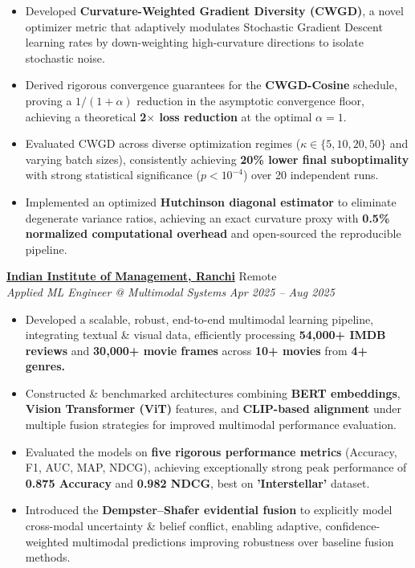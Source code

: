 \documentclass[10.5pt, a4paper]{article}
\newcommand{\resumeItem}[1]{\item[\textbullet] #1}
\newcommand{\expEntry}[4]{%
    \hspace*{-16pt}%
    \textbf{#1} \hfill #2 \\
    \hspace*{-12pt}%
    \textit{#3} \hfill \textit{#4} \\[-4pt]
    \vspace{-6pt}
}
\begin{document}
\begin{itemize}[leftmargin=-1pt,itemsep=1pt,topsep=-2pt,parsep=0pt]
\resumeItem{Developed \textbf{Curvature-Weighted Gradient Diversity (CWGD)}, a novel optimizer metric that adaptively modulates Stochastic Gradient Descent learning rates by down-weighting high-curvature directions to isolate stochastic noise.}

    \resumeItem{Derived rigorous convergence guarantees for the \textbf{CWGD-Cosine} schedule, proving a \textbf{$1/(1+\alpha)$} reduction in the asymptotic convergence floor, achieving a theoretical \textbf{2$\times$ loss reduction} at the optimal $\alpha=1$.}

    \resumeItem{Evaluated CWGD across diverse optimization regimes ($\kappa\in\{5,10,20,50\}$ and varying batch sizes), consistently achieving \textbf{20\% lower final suboptimality} with strong statistical significance (\textbf{$p<10^{-4}$}) over 20 independent runs.}

    \resumeItem{Implemented an optimized \textbf{Hutchinson diagonal estimator} to eliminate degenerate variance ratios, achieving an exact curvature proxy with \textbf{0.5\% normalized computational overhead} and open-sourced the reproducible pipeline.}
\end{itemize}
\vspace{1pt}

\expEntry
    {\href{https://github.com/Hamza-Faarooq/IIM_Research_Intern}{Indian Institute of Management, Ranchi}}{Remote}
    {Applied ML Engineer @ Multimodal Systems}{Apr 2025 -- Aug 2025}
        \vspace{-4pt}

\begin{itemize}[leftmargin=-1pt, itemsep=1pt, topsep=-2pt, parsep=0pt]
\resumeItem{Developed a scalable, robust, end-to-end multimodal learning pipeline, integrating textual \& visual data, efficiently processing \textbf{54,000+ IMDB reviews} and \textbf{30,000+ movie frames} across \textbf{10+ movies} from \textbf{4+ genres.}}

\resumeItem{Constructed \& benchmarked architectures combining \textbf{BERT embeddings}, \textbf{Vision Transformer (ViT)} features, and \textbf{CLIP-based alignment} under multiple fusion strategies for improved multimodal performance evaluation.}  

\resumeItem{Evaluated the models on \textbf{five rigorous performance metrics} (Accuracy, F1, AUC, MAP, NDCG), achieving exceptionally strong peak performance of \textbf{0.875 Accuracy} and \textbf{0.982 NDCG}, best on \textbf{'Interstellar'} dataset.}
\resumeItem{Introduced the \textbf{Dempster--Shafer evidential fusion} to explicitly model cross-modal uncertainty \& belief conflict, enabling adaptive, confidence-weighted multimodal predictions improving robustness over baseline fusion methods.}
\end{itemize}
\vspace{1pt}
\end{document}
